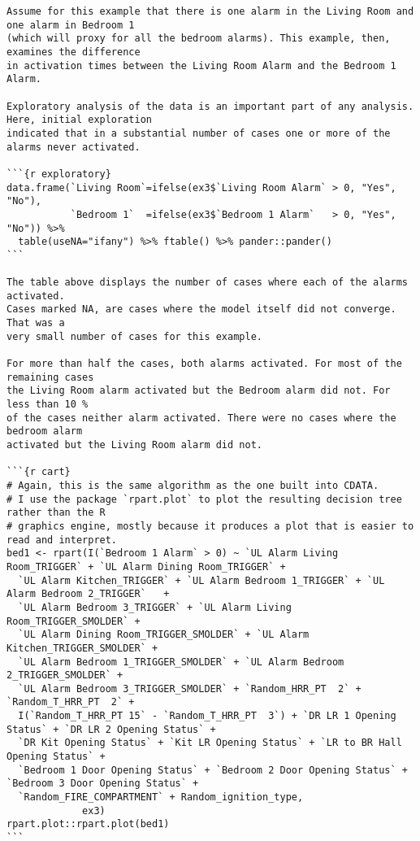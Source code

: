 \begin{lstlisting}[basicstyle=\scriptsize]
Assume for this example that there is one alarm in the Living Room and one alarm in Bedroom 1
(which will proxy for all the bedroom alarms). This example, then, examines the difference
in activation times between the Living Room Alarm and the Bedroom 1 Alarm.

Exploratory analysis of the data is an important part of any analysis. Here, initial exploration
indicated that in a substantial number of cases one or more of the alarms never activated.

```{r exploratory}
data.frame(`Living Room`=ifelse(ex3$`Living Room Alarm` > 0, "Yes", "No"),
           `Bedroom 1`  =ifelse(ex3$`Bedroom 1 Alarm`   > 0, "Yes", "No")) %>%
  table(useNA="ifany") %>% ftable() %>% pander::pander()
```

The table above displays the number of cases where each of the alarms activated.
Cases marked NA, are cases where the model itself did not converge. That was a
very small number of cases for this example.

For more than half the cases, both alarms activated. For most of the remaining cases
the Living Room alarm activated but the Bedroom alarm did not. For less than 10 %
of the cases neither alarm activated. There were no cases where the bedroom alarm
activated but the Living Room alarm did not.

```{r cart}
# Again, this is the same algorithm as the one built into CDATA.
# I use the package `rpart.plot` to plot the resulting decision tree rather than the R
# graphics engine, mostly because it produces a plot that is easier to read and interpret.
bed1 <- rpart(I(`Bedroom 1 Alarm` > 0) ~ `UL Alarm Living Room_TRIGGER` + `UL Alarm Dining Room_TRIGGER` +
  `UL Alarm Kitchen_TRIGGER` + `UL Alarm Bedroom 1_TRIGGER` + `UL Alarm Bedroom 2_TRIGGER`   +
  `UL Alarm Bedroom 3_TRIGGER` + `UL Alarm Living Room_TRIGGER_SMOLDER` +
  `UL Alarm Dining Room_TRIGGER_SMOLDER` + `UL Alarm Kitchen_TRIGGER_SMOLDER` +
  `UL Alarm Bedroom 1_TRIGGER_SMOLDER` + `UL Alarm Bedroom 2_TRIGGER_SMOLDER` +
  `UL Alarm Bedroom 3_TRIGGER_SMOLDER` + `Random_HRR_PT  2` + `Random_T_HRR_PT  2` +
  I(`Random_T_HRR_PT 15` - `Random_T_HRR_PT  3`) + `DR LR 1 Opening Status` + `DR LR 2 Opening Status` +
  `DR Kit Opening Status` + `Kit LR Opening Status` + `LR to BR Hall Opening Status` +
  `Bedroom 1 Door Opening Status` + `Bedroom 2 Door Opening Status` + `Bedroom 3 Door Opening Status` +
  `Random_FIRE_COMPARTMENT` + Random_ignition_type,
             ex3)
rpart.plot::rpart.plot(bed1)
```


\end{lstlisting}
